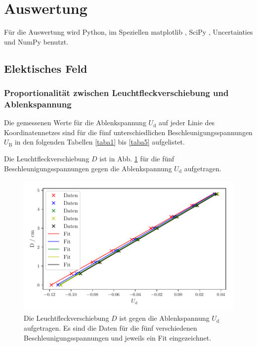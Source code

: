 \section{Auswertung}
\label{sec:Auswertung}

Für die Auswertung wird Python, im Speziellen matplotlib \cite{matplotlib}, 
SciPy \cite{scipy}, Uncertainties \cite{uncertainties}
und NumPy \cite{numpy} benutzt.

\subsection{Elektisches Feld}
\subsubsection{Proportionalität zwischen Leuchtfleckverschiebung und Ablenkspannung}
\label{sec:prop}
Die gemessenen Werte für die Ablenkspannung $U_\text{d}$
auf jeder Linie des Koordinatennetzes sind für die fünf
unterschiedlichen Beschleunigungsspannungen $U_\text{B}$
in den folgenden Tabellen \ref{taba1} bis \ref{taba5} aufgelistet.






\noindent Die Leuchtfleckverschiebung $D$ ist in Abb. \ref{fig:plot1}
für die fünf Beschleunigungsspannungen gegen die 
Ablenkspannung $U_\text{d}$ aufgetragen.
\begin{figure}
    \centering
    \includegraphics[width=12cm, height=7cm]{build/plot1.pdf}
    \caption{Die Leuchtfleckverschiebung $D$ ist gegen die
    Ablenkspannung $U_\text{d}$ aufgetragen. Es sind die Daten
    für die fünf verschiedenen Beschleunigungsspannungen und
    jeweils ein Fit eingezeichnet.}
    \label{fig:plot1}
\end{figure}

